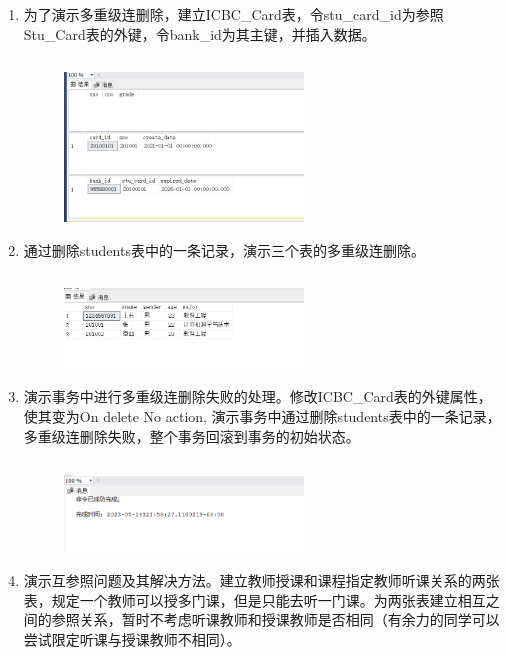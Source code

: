 \documentclass[a4paper,twoside]{article}
\begin{document}
\begin{spacing}{1.2}
\begin{enumerate}
\item 为了演示多重级连删除，建立ICBC\_Card表，令stu\_card\_id为参照Stu\_Card表的外键，令bank\_id为其主键，并插入数据。
\inputminted[firstline=61,lastline=71]{sql}{../code/2.sql}
\begin{figure}[H]
  \centering
  \includegraphics[width=0.6\textwidth]{8.png}
\end{figure}
\item 通过删除students表中的一条记录，演示三个表的多重级连删除。
\inputminted[firstline=74,lastline=79]{sql}{../code/2.sql}
\begin{figure}[H]
  \centering
  \includegraphics[width=0.6\textwidth]{9.png}
\end{figure}
\item 演示事务中进行多重级连删除失败的处理。修改ICBC\_Card表的外键属性，使其变为On delete No action, 演示事务中通过删除students表中的一条记录，多重级连删除失败，整个事务回滚到事务的初始状态。
\inputminted[firstline=82,lastline=100]{sql}{../code/2.sql}
\begin{figure}[H]
  \centering
  \includegraphics[width=0.6\textwidth]{10.png}
\end{figure}
\item 演示互参照问题及其解决方法。建立教师授课和课程指定教师听课关系的两张表，规定一个教师可以授多门课，但是只能去听一门课。为两张表建立相互之间的参照关系，暂时不考虑听课教师和授课教师是否相同（有余力的同学可以尝试限定听课与授课教师不相同）。
\inputminted[firstline=104,lastline=135]{sql}{../code/2.sql}
\end{enumerate}


\end{spacing}
\end{document}
